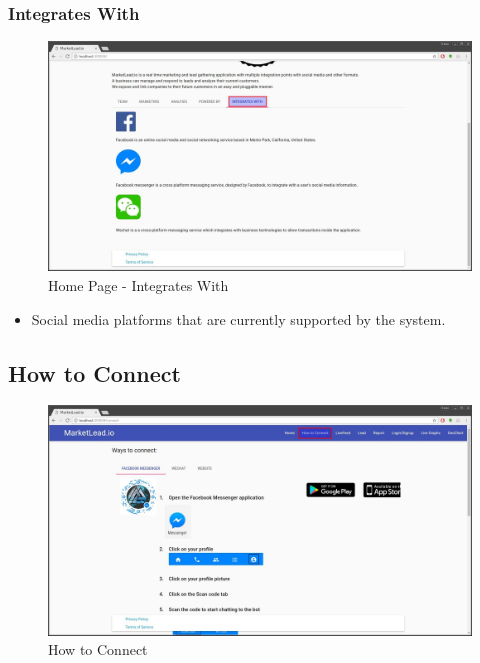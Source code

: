 \documentclass{article}
\begin{document}
			\subsubsection{Integrates With}
				\begin{figure}[H]
					\includegraphics[width=\textwidth]{images/home_integrates_with.jpg}
					\caption{Home Page - Integrates With}
					\label{fig:homeIntegratesWith}
				\end{figure}

				\begin{itemize}
					\item Social media platforms that are currently supported by the system.
				\end{itemize}

		\subsection{How to Connect}
			\begin{figure}[H]
				\includegraphics[width=\textwidth]{images/how_to_connect.jpg}
				\caption{How to Connect}
				\label{fig:howToConnect}
			\end{figure}
\end{document}
